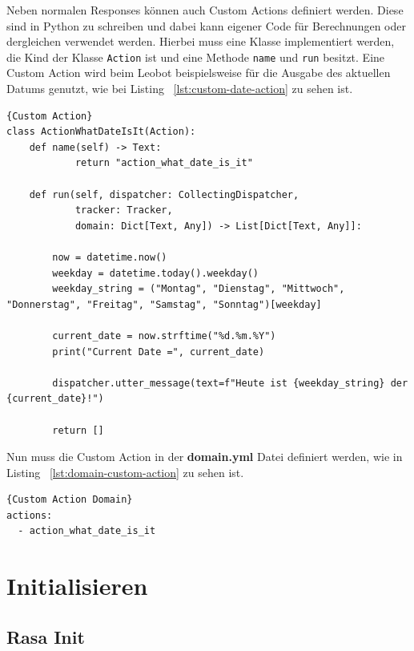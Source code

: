 Neben normalen Responses können auch Custom Actions definiert werden.
Diese sind in Python zu schreiben und dabei kann eigener Code für Berechnungen oder dergleichen verwendet werden.
Hierbei muss eine Klasse implementiert werden, die Kind der Klasse \texttt{Action} ist und eine Methode \texttt{name} und \texttt{run} besitzt.
Eine Custom Action wird beim Leobot beispielsweise für die Ausgabe des aktuellen Datums genutzt, wie bei Listing ~\ref{lst:custom-date-action} zu sehen ist.

\begin{lstlisting}[label={lst:custom-date-action},caption={Custom Action für die Ausgabe des aktuellen Datums}]{Custom Action}
class ActionWhatDateIsIt(Action):
    def name(self) -> Text:
            return "action_what_date_is_it"

    def run(self, dispatcher: CollectingDispatcher,
            tracker: Tracker,
            domain: Dict[Text, Any]) -> List[Dict[Text, Any]]:

        now = datetime.now()
        weekday = datetime.today().weekday()
        weekday_string = ("Montag", "Dienstag", "Mittwoch", "Donnerstag", "Freitag", "Samstag", "Sonntag")[weekday]

        current_date = now.strftime("%d.%m.%Y")
        print("Current Date =", current_date)

        dispatcher.utter_message(text=f"Heute ist {weekday_string} der {current_date}!")

        return []
\end{lstlisting}

Nun muss die Custom Action in der \textbf{domain.yml} Datei definiert werden, wie in Listing ~\ref{lst:domain-custom-action} zu sehen ist.

\begin{lstlisting}[label={lst:domain-custom-action},caption={Custom Actions in Domain definiert}]{Custom Action Domain}
actions:
  - action_what_date_is_it
\end{lstlisting}

\section{Initialisieren}\label{section:initialize}

\subsection{Rasa Init}\label{subsec:rasa-init}

